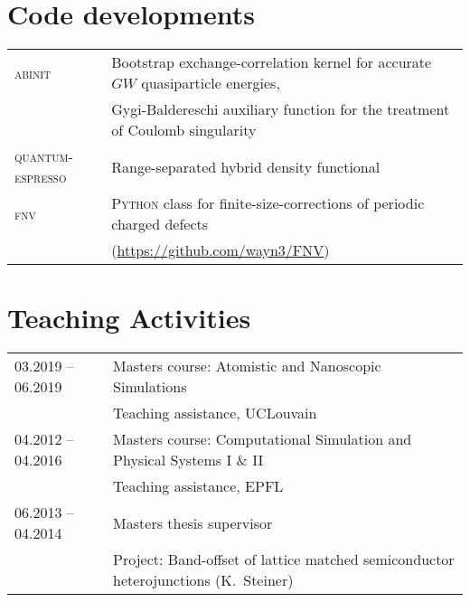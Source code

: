 \documentclass[a4paper, 11pt, DIV=15, headings=normal]{scrartcl}
\begin{document}
\section*{Code developments}
\begin{tabular}{ll}
\textsc{abinit}  & Bootstrap exchange-correlation kernel for accurate $GW$ quasiparticle energies, \\
                 & Gygi-Baldereschi auxiliary function for the treatment of
Coulomb singularity \\
\textsc{quantum-espresso} & Range-separated hybrid density functional \\
\textsc{fnv}     & \textsc{Python} class for finite-size-corrections of
periodic charged defects \\
                 & (\url{https://github.com/wayn3/FNV})
\\
\end{tabular} 

\section*{Teaching Activities}
\begin{tabular}{ll}
03.2019 -- 06.2019 & Masters course: Atomistic and Nanoscopic Simulations \\
                   & Teaching assistance, UCLouvain\\
04.2012 -- 04.2016 & Masters course: Computational Simulation and Physical Systems I \& II \\
                   & Teaching assistance, EPFL\\
06.2013 -- 04.2014 & Masters thesis supervisor\\
                   & Project: Band-offset of lattice matched semiconductor heterojunctions (K.\ Steiner)
\end{tabular}
\end{document}
